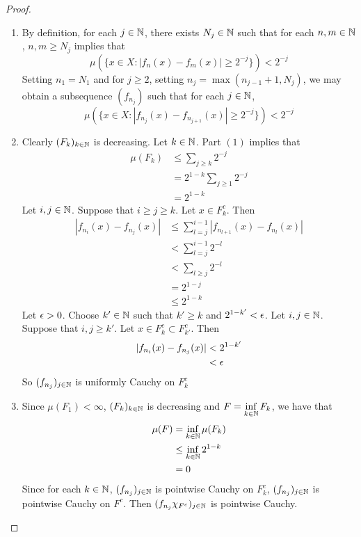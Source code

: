 \documentclass{book}
\begin{document}
	\begin{proof}\
	\begin{enumerate}
	\item By definition, for each $j \in \mathbb{N}$, there exists $N_j \in \mathbb{N}$ such that for each $n,m \in \mathbb{N}$, $n,m \geq N_j$ implies that 
	$$\mu(\{x \in X: |f_n(x) - f_m(x)| \geq 2^{-j} \}) < 2^{-j}$$ 
	Setting $n_1 = N_1$ and for $j \geq 2$, setting $n_j = \max (n_{j-1}+1, N_j)$, we may obtain a subsequence $(f_{n_j})$ such that for each $j \in \mathbb{N}$, 
	$$\mu(\{x \in X: |f_{n_j}(x) - f_{n_{j+1}}(x)| \geq 2^{-j}\}) < 2^{-j}$$
	\item Clearly $(F_k)_{k \in \mathbb{N}}$ is decreasing. Let $k \in \mathbb{N}$. Part $(1)$ implies that 
	\begin{align*}
	\mu(F_k) 
	&\leq \sum_{j \geq k}2^{-j} \\
	&= 2^{1-k}\sum_{j \geq 1}2^{-j}  \\
	&= 2^{1-k}
	\end{align*}
	Let $i, j \in \mathbb{N}$. Suppose that $i \geq j \geq k$. Let $x \in F_k^c$. Then 
	\begin{align*}
	|f_{n_i}(x) - f_{n_j}(x)| 
	& \leq \sum_{l = j}^{i-1} |f_{n_{l+1}}(x) - f_{n_l}(x)| \\
	& < \sum_{l = j}^{i-1} 2^{-l} \\
	& <  \sum_{l \geq j} 2^{-l} \\
	&= 2^{1 - j} \\
	& \leq 2^{1 - k}	 
	\end{align*}
	Let $\epsilon >0$. Choose $k' \in \mathbb{N}$ such that $k' \geq k$ and $2^{1-k'} < \epsilon$. Let $i,j \in \mathbb{N}$. Suppose that $i,j \geq k'$. Let $x \in F_k^c \subset F_{k'}^c$. Then 
	\begin{align*}
	|f_{n_i}(x) - f_{n_j}(x)| 
	&< 2^{1-k'} \\
	&< \epsilon 
	\end{align*}
	So $(f_{n_j})_{j \in \mathbb{N}}$ is uniformly Cauchy on $F_k^c$
	\item Since $\mu(F_1) < \infty $, $(F_k)_{k \in \mathbb{N}}$ is decreasing and $F = \inf\limits_{k \in \mathbb{N}}F_k$, we have that
	\begin{align*}
	\mu(F) 
	&= \inf_{k \in \mathbb{N}} \mu(F_k) \\
	&\leq \inf_{k \in \mathbb{N}} 2^{1-k} \\
	&= 0
	\end{align*}
	Since for each $k \in \mathbb{N}$, $(f_{n_j})_{j \in \mathbb{N}}$ is pointwise Cauchy on $F^c_k$, $(f_{n_j})_{j \in \mathbb{N}}$ is pointwise Cauchy on $F^c$. Then $(f_{n_j}\chi_{F^c})_{j \in \mathbb{N}}$ is pointwise Cauchy. \\

\end{enumerate}
\end{proof}
\end{document}
